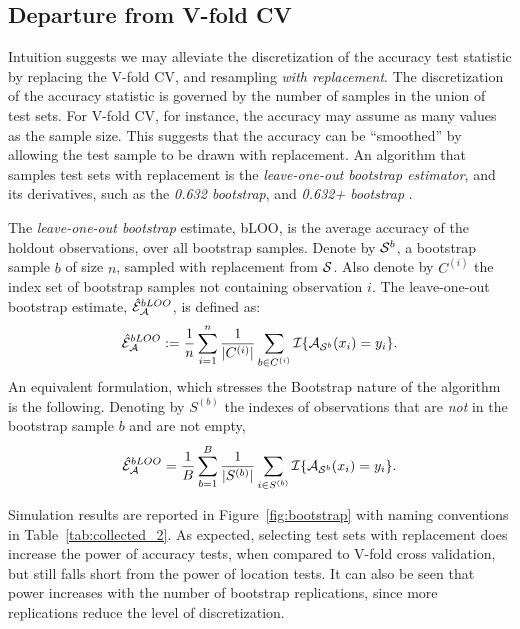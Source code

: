\documentclass[12pt,a4paper]{article}
\begin{document}
\subsection{Departure from V-fold CV}
\label{sec:bootstrap}

Intuition suggests we may alleviate the discretization of the accuracy test statistic by replacing the V-fold CV, and resampling \emph{with replacement}.
The discretization of the accuracy statistic is governed by the number of samples in the union of test sets.
For V-fold CV, for instance, the accuracy may assume as many values as the sample size. 
This suggests that the accuracy can be ``smoothed'' by allowing the test sample to be drawn with replacement. 
An algorithm that samples test sets with replacement is the \emph{leave-one-out bootstrap estimator},  and its derivatives, such as the \emph{0.632 bootstrap}, and \emph{0.632+ bootstrap} \citep[Sec 7.11]{hastie_elements_2003}.
\begin{definition}[bLOO]
	\label{def:bloo}
	The \emph{leave-one-out bootstrap} estimate, bLOO, is the average accuracy of the holdout observations, over all bootstrap samples. 
	Denote by $\mathcal{S}^b$, a bootstrap sample $b$ of size $n$, sampled with replacement from $\mathcal{S}$. 
	Also denote by $C^{(i)}$ the index set of bootstrap samples not containing observation $i$.
	The leave-one-out bootstrap estimate, $\hat{\mathcal{E}}_{\mathcal{A}}^{bLOO}$,  is defined as:
	\begin{align}
	\hat{\mathcal{E}}_{\mathcal{A}}^{bLOO}:= \frac 1n \sum_{i=1}^{n} \frac{1}{|C^{(i)}|} \sum_{b \in C^{(i)}} \mathcal{I}{\{ \mathcal{A}_{\mathcal{S}^b}(x_i)=y_i \}}.
	\end{align}
	An equivalent formulation, which stresses the Bootstrap nature of the algorithm is the following. 
	Denoting by $S^{(b)}$ the indexes of observations that are \emph{not} in the bootstrap sample $b$ and are not empty, 
	\begin{align}
	\hat{\mathcal{E}}_{\mathcal{A}}^{bLOO} = \frac 1B \sum_{b=1}^{B} \frac{1}{|S^{(b)}|} \sum_{i \in S^{(b)}} \mathcal{I}{\{ \mathcal{A}_{\mathcal{S}^b}(x_i)=y_i \}}.
	\end{align}
\end{definition}


Simulation results are reported in Figure~\ref{fig:bootstrap} with naming conventions in Table~\ref{tab:collected_2}.
As expected, selecting test sets with replacement does increase the power of accuracy tests, when compared to V-fold cross validation, but still falls short from the power of location tests. 
It can also be seen that power increases with the number of bootstrap replications, since more replications reduce the level of discretization.
\end{document}
